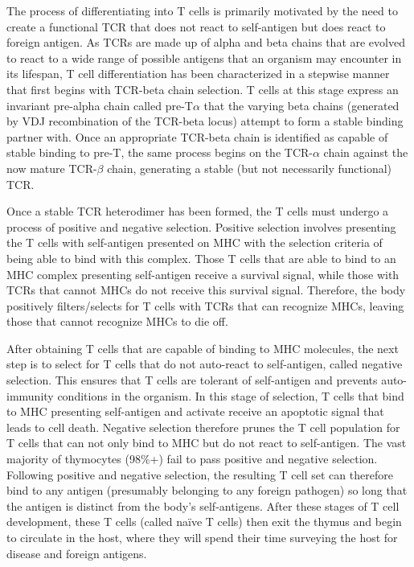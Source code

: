 The process of differentiating into T cells is primarily motivated by the need to create a functional TCR that does not react to self-antigen but does react to foreign antigen. As TCRs are made up of alpha and beta chains that are evolved to react to a wide range of possible antigens that an organism may encounter in its lifespan, T cell differentiation has been characterized in a stepwise manner that first begins with TCR-beta chain selection. T cells at this stage express an invariant pre-alpha chain called pre-T$\alpha$ that the varying beta chains (generated by VDJ recombination of the TCR-beta locus) attempt to form a stable binding partner with. Once an appropriate TCR-beta chain is identified as capable of stable binding to pre-T, the same process begins on the TCR-$\alpha$ chain against the now mature TCR-$\beta$ chain, generating a stable (but not necessarily functional) TCR.

Once a stable TCR heterodimer has been formed, the T cells must undergo a process of positive and negative selection. Positive selection involves presenting the T cells with self-antigen presented on MHC with the selection criteria of being able to bind with this complex. Those T cells that are able to bind to an MHC complex presenting self-antigen receive a survival signal, while those with TCRs that cannot MHCs do not receive this survival signal. Therefore, the body positively filters/selects for T cells with TCRs that can recognize MHCs, leaving those that cannot recognize MHCs to die off. 

After obtaining T cells that are capable of binding to MHC molecules, the next step is to select for T cells that do not auto-react to self-antigen, called negative selection. This ensures that T cells are tolerant of self-antigen and prevents auto-immunity conditions in the organism. In this stage of selection, T cells that bind to MHC presenting self-antigen and activate receive an apoptotic signal that leads to cell death. Negative selection therefore prunes the T cell population for T cells that can not only bind to MHC but do not react to self-antigen. The vast majority of thymocytes (98\%+) fail to pass positive and negative selection. Following positive and negative selection, the resulting T cell set can therefore bind to any antigen (presumably belonging to any foreign pathogen) so long that the antigen is distinct from the body’s self-antigens. 
After these stages of T cell development, these T cells (called naïve T cells) then exit the thymus and begin to circulate in the host, where they will spend their time surveying the host for disease and foreign antigens.

